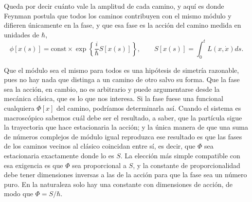         Queda por decir cuánto vale la amplitud de cada camino, y aquí es donde Feynman postula que todos los caminos contribuyen con el mismo módulo y difieren únicamente en la fase, y que esa fase es la acción del camino medida en unidades de $\hbar$,
        \begin{equation}\label{eq:PostuladoFeynman}
            \phi[x(s)] = \text{const}\times \exp\left\{\frac{i}{\hbar}S[x(s)]\right\},
            \qquad
            S[x(s)] = \int_{0}^{t} L\left(x,\dot{x}\right) ds .
        \end{equation}

        Que el módulo sea el mismo para todos es una hipótesis de simetría razonable, pues no hay nada que distinga a un camino de otro salvo su forma. Que la fase sea la acción, en cambio, no es arbitrario y puede argumentarse desde la mecánica clásica, que es lo que nos interesa. Si la fase fuese una funcional cualquiera $\Phi[x]$ del camino, podríamos determinarla así. Cuando el sistema es macroscópico sabemos cuál debe ser el resultado, a saber, que la partícula sigue la trayectoria que hace estacionaria la acción; y la única manera de que una suma de números complejos de módulo igual reproduzca ese resultado es que las fases de los caminos vecinos al clásico coincidan entre sí, es decir, que $\Phi$ sea estacionaria exactamente donde lo es $S$. La elección más simple compatible con esa exigencia es que $\Phi$ sea proporcional a $S$, y la constante de proporcionalidad debe tener dimensiones inversas a las de la acción para que la fase sea un número puro. En la naturaleza solo hay una constante con dimensiones de acción, de modo que $\Phi = S/\hbar$.

